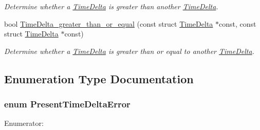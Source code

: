 \begin{DoxyCompactItemize}
\begin{DoxyCompactList}\small\item\em \-Determine whether a \hyperlink{structTimeDelta}{\-Time\-Delta} is greater than another \hyperlink{structTimeDelta}{\-Time\-Delta}. \end{DoxyCompactList}\item 
bool \hyperlink{time-delta_8h_aca2a28b813b68c66a3754ecf311350b8}{\-Time\-Delta\-\_\-greater\-\_\-than\-\_\-or\-\_\-equal} (const struct \hyperlink{structTimeDelta}{\-Time\-Delta} $\ast$const, const struct \hyperlink{structTimeDelta}{\-Time\-Delta} $\ast$const)
\begin{DoxyCompactList}\small\item\em \-Determine whether a \hyperlink{structTimeDelta}{\-Time\-Delta} is greater than or equal to another \hyperlink{structTimeDelta}{\-Time\-Delta}. \end{DoxyCompactList}\end{DoxyCompactItemize}


\subsection{\-Enumeration \-Type \-Documentation}
\hypertarget{time-delta_8h_a6090105e9137c36754994cda35937b59}{
\subsubsection[{\-Present\-Time\-Delta\-Error}]{\setlength{\rightskip}{0pt plus 5cm}enum {\bf \-Present\-Time\-Delta\-Error}}}\label{time-delta_8h_a6090105e9137c36754994cda35937b59}
\begin{Desc}
\item[\-Enumerator\-: ]\par
\begin{description}
\item[{\em 
\hypertarget{time-delta_8h_a6090105e9137c36754994cda35937b59a61286fb07f463a3add14112870d9f834}{\-Time\-Delta\-\_\-\-E\-R\-R\-O\-R\-\_\-\-N\-O\-N\-E}\label{time-delta_8h_a6090105e9137c36754994cda35937b59a61286fb07f463a3add14112870d9f834}
}]\end{description}
\end{Desc}



